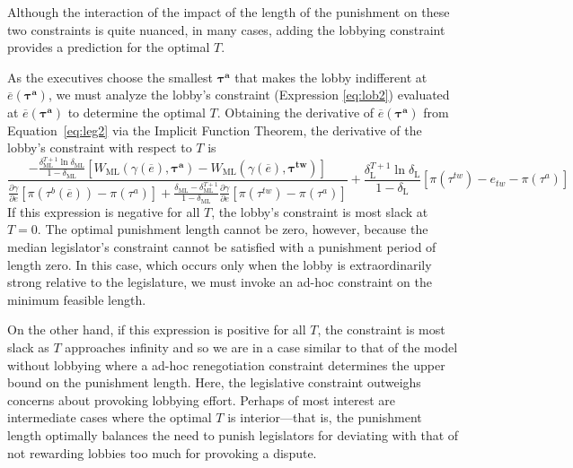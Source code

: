 \documentclass[authoryear, review]{elsarticle}
\newcommand{\ov}{\overline}
\newcommand{\bta}{\bm{\tau^a}}
\newcommand{\ga}{\gamma}
\newcommand{\btw}{\bm{\tau^{tw}}}
\newcommand{\de}{\delta}
\begin{document}
Although the interaction of the impact of the length of the punishment on these two constraints is quite nuanced, in many cases, adding the lobbying constraint provides a prediction for the optimal $T$.

As the executives choose the smallest $\bta$ that makes the lobby indifferent at $\ov{e}(\bta)$, we must analyze the lobby's constraint (Expression \ref{eq:lob2}) evaluated at $\ov{e}(\bta)$ to determine the optimal $T$. Obtaining the derivative of $\ov{e}(\bta)$ from Equation~\ref{eq:leg2} via the Implicit Function Theorem, the derivative of the lobby's constraint with respect to $T$ is
\begin{equation}
 	\frac{ -\frac{\de_\text{ML}^{T+1}\ln\de_\text{ML}}{1-\de_\text{ML}}\left[  W_\text{ML}(\ga(\ov{e}),\bta) - W_\text{ML}(\ga(\ov{e}),\btw) \right]}{\frac{\partial \ga}{\partial e} \left[ \pi(\tau^b(\ov{e})) - \pi(\tau^a) \right] + \frac{\de_\text{ML} - \de_\text{ML}^{T+1}}{1-\de_\text{ML}}\frac{\partial \ga}{\partial e} \left[ \pi(\tau^{tw}) - \pi(\tau^a) \right]} +  \frac{\de_\text{L}^{T+1} \ln \de_\text{L}}{1-\de_\text{L}} \left[ \pi(\tau^{tw}) - e_{tw} -\pi(\tau^a) \right]
 	\label{ine:T}
\end{equation}
If this expression is negative for all $T$, the lobby's constraint is most slack at $T=0$. The optimal punishment length cannot be zero, however, because the median legislator's constraint cannot be satisfied with a punishment period of length zero. In this case, which occurs only when the lobby is extraordinarily strong relative to the legislature, we must invoke an ad-hoc constraint on the minimum feasible length.

On the other hand, if this expression is positive for all $T$, the constraint is most slack as $T$ approaches infinity and so we are in a case similar to that of the model without lobbying where a ad-hoc renegotiation constraint determines the upper bound on the punishment length. Here, the legislative constraint outweighs concerns about provoking lobbying effort. Perhaps of most interest are intermediate cases where the optimal $T$ is interior---that is, the punishment length optimally balances the need to punish legislators for deviating with that of not rewarding lobbies too much for provoking a dispute.
\end{document}
